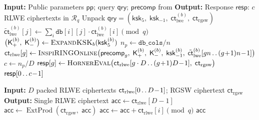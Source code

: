 \documentclass[11pt,a4paper]{article}
\DeclareMathOperator{\ExternalProd}{ExtProd}
\newcommand{\R}{\mathcal{R}}
\newcommand{\Rq}{\R_{q}}
\begin{document}
\begin{algorithm}[H]
\caption{$\textsc{Answer}(\mathsf{pp},\; \mathsf{qry},\; \mathsf{precomp})$}
\label{alg:answer}
\begin{algorithmic}[1]
\State \textbf{Input:} Public parameters $\mathsf{pp}$; query $\mathsf{qry}$; $\mathsf{precomp}$ from 
\State \textbf{Output:} Response $\mathsf{resp}$: $c$ RLWE ciphertexts in $\Rq$
\State Unpack $\mathsf{qry} = (\mathsf{ksk}_5,\; \mathsf{ksk}_{-1},\; \mathsf{ct}_{\mathrm{lwe}}^{(b)},\; \mathsf{ct}_{\mathrm{rgsw}})$
\Statex {}
 
    \State $\tilde{\mathsf{ct}}_{\mathrm{lwe}}^{(b)}[j] \gets \sum_{i} \texttt{db}[i][j] \cdot \mathsf{ct}_{\mathrm{lwe}}^{(b)}[i] \pmod{q}$ 
\EndFor
\Statex {}
\State $\bigl(\mathsf{K}_{+}^{(b)},\; \mathsf{K}_{-}^{(b)}\bigr) \gets \textsc{ExpandKSK}_b(\mathsf{ksk}_5^{(b)})$ 
\State $n_p \gets \texttt{db\_cols} / n$
    \State $\mathsf{ct}_{\mathrm{rlwe}}[g] \gets \textsc{InspiRINGOnline}\bigl(\mathsf{precomp}_g,\; \mathsf{K}_{+}^{(b)},\; \mathsf{K}_{-}^{(b)},\; \mathsf{ksk}_{-1}^{(b)},\; \tilde{\mathsf{ct}}_{\mathrm{lwe}}^{(b)}[gn \mathinner{.\,.} (g\!+\!1)n\!-\!1]\bigr)$ 
\EndFor
\Statex {}
\State $c \gets n_p / D$
 
    \State $\mathsf{resp}[g] \gets \textsc{HornerEval}\bigl(\mathsf{ct}_{\mathrm{rlwe}}[g \cdot D \mathinner{.\,.} (g\!+\!1)D\!-\!1],\; \mathsf{ct}_{\mathrm{rgsw}}\bigr)$
\EndFor
\State \Return $\mathsf{resp}[0 \mathinner{.\,.} c\!-\!1]$
\end{algorithmic}
\end{algorithm}

\begin{algorithm}[H]
\caption{$\textsc{HornerEval}(\mathsf{ct}_{\mathrm{rlwe}}[0 \mathinner{.\,.} D\!-\!1],\; \mathsf{ct}_{\mathrm{rgsw}})$: Evaluate one interpolation polynomial via Horner's method.}
\label{alg:horner}
\begin{algorithmic}[1]
\State \textbf{Input:} $D$ packed RLWE ciphertexts $\mathsf{ct}_{\mathrm{rlwe}}[0 \mathinner{.\,.} D\!-\!1]$; RGSW ciphertext $\mathsf{ct}_{\mathrm{rgsw}}$
\State \textbf{Output:} Single RLWE ciphertext
\Statex
\State $\mathsf{acc} \gets \mathsf{ct}_{\mathrm{rlwe}}[D - 1]$ 
    \State $\mathsf{acc} \gets \ExternalProd(\mathsf{ct}_{\mathrm{rgsw}},\; \mathsf{acc})$ 
    \State $\mathsf{acc} \gets \mathsf{acc} + \mathsf{ct}_{\mathrm{rlwe}}[i] \pmod{q}$
\EndFor
\State \Return $\mathsf{acc}$
\end{algorithmic}
\end{algorithm}
\end{document}
